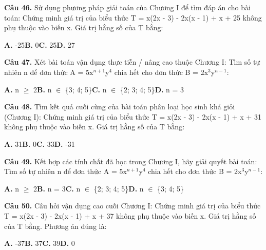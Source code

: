 \documentclass[11pt,a4paper]{article}
\begin{document}
\textbf{\color{primary} Câu 46.} Sử dụng phương pháp giải toán của Chương I để tìm đáp án cho bài toán: Chứng minh giá trị của biểu thức T = x(2x - 3) - 2x(x - 1) + x + 25 không phụ thuộc vào biến x. Giá trị hằng số của T bằng:\par
\hspace*{1.5em}\textbf{A.} -25\quad\quad \textbf{B.} 0\quad\quad \textbf{C.} 25\quad\quad \textbf{D.} 27\par\vspace{2pt}
\textbf{\color{primary} Câu 47.} Xét bài toán vận dụng thực tiễn / nâng cao thuộc Chương I: Tìm số tự nhiên n để đơn thức A = 5x$^{n+1}$y$^4$ chia hết cho đơn thức B = 2x$^3$y$^{n-1}$:\par
\hspace*{1.5em}\textbf{A.} n $\ge$ 2\quad\quad \textbf{B.} n $\in$ \{3; 4; 5\}\quad\quad \textbf{C.} n $\in$ \{2; 3; 4; 5\}\quad\quad \textbf{D.} n = 3\par\vspace{2pt}
\textbf{\color{primary} Câu 48.} Tìm kết quả cuối cùng của bài toán phân loại học sinh khá giỏi (Chương I): Chứng minh giá trị của biểu thức T = x(2x - 3) - 2x(x - 1) + x + 31 không phụ thuộc vào biến x. Giá trị hằng số của T bằng:\par
\hspace*{1.5em}\textbf{A.} 31\quad\quad \textbf{B.} 0\quad\quad \textbf{C.} 33\quad\quad \textbf{D.} -31\par\vspace{2pt}
\textbf{\color{primary} Câu 49.} Kết hợp các tính chất đã học trong Chương I, hãy giải quyết bài toán: Tìm số tự nhiên n để đơn thức A = 5x$^{n+1}$y$^4$ chia hết cho đơn thức B = 2x$^3$y$^{n-1}$:\par
\hspace*{1.5em}\textbf{A.} n $\ge$ 2\quad\quad \textbf{B.} n = 3\quad\quad \textbf{C.} n $\in$ \{2; 3; 4; 5\}\quad\quad \textbf{D.} n $\in$ \{3; 4; 5\}\par\vspace{2pt}
\textbf{\color{primary} Câu 50.} Câu hỏi vận dụng cao cuối Chương I: Chứng minh giá trị của biểu thức T = x(2x - 3) - 2x(x - 1) + x + 37 không phụ thuộc vào biến x. Giá trị hằng số của T bằng. Phương án đúng là:\par
\hspace*{1.5em}\textbf{A.} -37\quad\quad \textbf{B.} 37\quad\quad \textbf{C.} 39\quad\quad \textbf{D.} 0\par\vspace{2pt}
\end{document}
